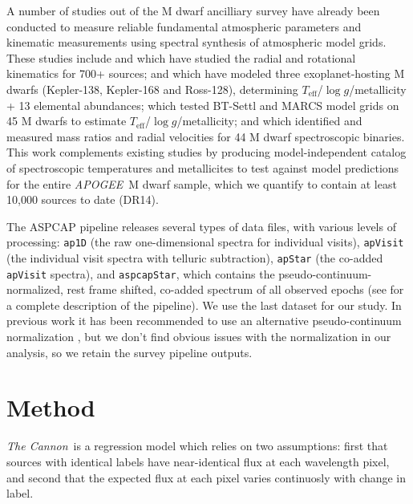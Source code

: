 \documentclass[twocolumn]{aastex62}
\newcommand{\apogee}{\textsl{APOGEE}}
\newcommand{\thecannon}{\textsl{The Cannon}}
\newcommand{\teff}{T_{\mathrm{eff}}}
\newcommand{\logg}{\log g}
\begin{document}
A number of studies out of the M dwarf ancilliary survey have already been conducted to measure reliable fundamental atmospheric parameters and kinematic measurements using spectral synthesis of atmospheric model grids. 
These studies include \citealt{Desphande:2013} and \citealt{Gilhool:2018} which have studied the radial and rotational kinematics for 700+ sources;
\citealt{Souto:2017} and \citealt{Souto:2018} which have modeled three exoplanet-hosting M dwarfs (Kepler-138, Kepler-168 and Ross-128), determining $\teff$/$\logg$/metallicity + 13 elemental abundances;
\citealt{Rajpurohit:2018} which tested BT-Settl \citep{Allard:2012} and MARCS \citep{Gustafsson:2008} model grids on 45 M dwarfs to estimate $\teff$/$\logg$/metallicity;
and \citealt{Skinner:2018} which identified and measured mass ratios and radial velocities for 44 M dwarf spectroscopic binaries.
This work complements existing studies by producing model-independent catalog of spectroscopic temperatures and metallicites to test against model predictions for the entire \apogee\ M dwarf sample, which we quantify to contain at least 10,000 sources to date (DR14).

The ASPCAP pipeline releases several types of data files, with various levels of processing: {\tt\string ap1D} (the raw one-dimensional spectra for individual visits), {\tt\string apVisit} (the individual visit spectra with telluric subtraction), {\tt\string apStar} (the co-added {\tt\string apVisit} spectra), and {\tt\string aspcapStar}, which contains the pseudo-continuum-normalized, rest frame shifted, co-added spectrum of all observed epochs (see \citealt{Perez:2016} for a complete description of the pipeline). We use the last dataset for our study.
In previous work it has been recommended to use an alternative pseudo-continuum normalization \citep{Ness:2015}, but we don't find obvious issues with the normalization in our analysis, so we retain the survey pipeline outputs.


\section{Method} \label{sec:methods}

\thecannon\ is a regression model which relies on two assumptions: first that sources with identical labels have near-identical flux at each wavelength pixel, and second that the expected flux at each pixel varies continuosly with change in label. 
\end{document}
